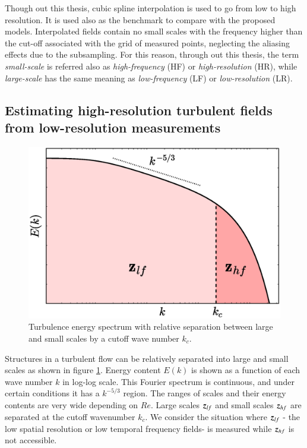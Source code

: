 Though out this thesis, cubic spline interpolation is used to go from low to high resolution. It is used also as the benchmark to compare with the proposed models. Interpolated fields contain no small scales with the frequency higher than the cut-off associated with the grid of measured points, neglecting the aliasing effects due to the subsampling. For this reason, through out this thesis, the term \textit{small-scale} is referred also as \textit{high-frequency} (HF) or \textit{high-resolution} (HR), while \textit{large-scale} has the same meaning as \textit{low-frequency} (LF) or \textit{low-resolution} (LR).

\subsection{Estimating high-resolution turbulent fields from low-resolution measurements}
\label{sec:probdef1}

\begin{figure}
\centering
	\includegraphics[width=0.6\columnwidth]{./images/probdef/turbulence/turbulence_spectra_long.eps}
	\caption{\label{fig:turbulence_spectra} Turbulence energy spectrum with relative separation between large and small scales by a cutoff wave number $ k_c $.}
\end{figure}

Structures in a turbulent flow can be relatively separated into large and small scales as shown in figure \ref{fig:turbulence_spectra}. Energy content $ E(k) $ is shown as a function of each wave number $ k $ in log-log scale. This Fourier spectrum is continuous, and under certain conditions it has a $ k^{-5/3} $ region. The ranges of scales and their energy contents are very wide depending on $ Re $. Large scales $ \operatorname{\boldsymbol{z}}_{lf} $ and small scales $ \operatorname{\boldsymbol{z}}_{hf} $ are separated at the cutoff wavenumber $ k_c $. We consider the situation where $ \operatorname{\boldsymbol{z}}_{lf} $ - the low spatial resolution or low temporal frequency fields- is measured while $ \operatorname{\boldsymbol{z}}_{hf} $ is not accessible. 


